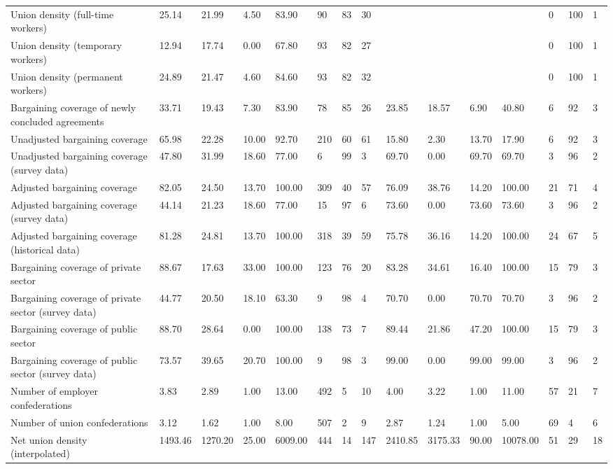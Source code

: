 \begin{longtable}{lllllllllllllll}
Union density (full-time workers) & 25.14 & 21.99 & 4.50 & 83.90 & 90 & 83 & 30 &  &  &  &  & 0 & 100 & 1\\
Union density (temporary workers) & 12.94 & 17.74 & 0.00 & 67.80 & 93 & 82 & 27 &  &  &  &  & 0 & 100 & 1\\
Union density (permanent workers) & 24.89 & 21.47 & 4.60 & 84.60 & 93 & 82 & 32 &  &  &  &  & 0 & 100 & 1\\
\addlinespace
Bargaining coverage of newly concluded agreements & 33.71 & 19.43 & 7.30 & 83.90 & 78 & 85 & 26 & 23.85 & 18.57 & 6.90 & 40.80 & 6 & 92 & 3\\
Unadjusted bargaining coverage & 65.98 & 22.28 & 10.00 & 92.70 & 210 & 60 & 61 & 15.80 & 2.30 & 13.70 & 17.90 & 6 & 92 & 3\\
Unadjusted bargaining coverage (survey data) & 47.80 & 31.99 & 18.60 & 77.00 & 6 & 99 & 3 & 69.70 & 0.00 & 69.70 & 69.70 & 3 & 96 & 2\\
Adjusted bargaining coverage & 82.05 & 24.50 & 13.70 & 100.00 & 309 & 40 & 57 & 76.09 & 38.76 & 14.20 & 100.00 & 21 & 71 & 4\\
Adjusted bargaining coverage (survey data) & 44.14 & 21.23 & 18.60 & 77.00 & 15 & 97 & 6 & 73.60 & 0.00 & 73.60 & 73.60 & 3 & 96 & 2\\
\addlinespace
Adjusted bargaining coverage (historical data) & 81.28 & 24.81 & 13.70 & 100.00 & 318 & 39 & 59 & 75.78 & 36.16 & 14.20 & 100.00 & 24 & 67 & 5\\
Bargaining coverage of private sector & 88.67 & 17.63 & 33.00 & 100.00 & 123 & 76 & 20 & 83.28 & 34.61 & 16.40 & 100.00 & 15 & 79 & 3\\
Bargaining coverage of private sector (survey data) & 44.77 & 20.50 & 18.10 & 63.30 & 9 & 98 & 4 & 70.70 & 0.00 & 70.70 & 70.70 & 3 & 96 & 2\\
Bargaining coverage of public sector & 88.70 & 28.64 & 0.00 & 100.00 & 138 & 73 & 7 & 89.44 & 21.86 & 47.20 & 100.00 & 15 & 79 & 3\\
Bargaining coverage of public sector (survey data) & 73.57 & 39.65 & 20.70 & 100.00 & 9 & 98 & 3 & 99.00 & 0.00 & 99.00 & 99.00 & 3 & 96 & 2\\
\addlinespace
Number of employer confederations & 3.83 & 2.89 & 1.00 & 13.00 & 492 & 5 & 10 & 4.00 & 3.22 & 1.00 & 11.00 & 57 & 21 & 7\\
Number of union confederations & 3.12 & 1.62 & 1.00 & 8.00 & 507 & 2 & 9 & 2.87 & 1.24 & 1.00 & 5.00 & 69 & 4 & 6\\
Net union density (interpolated) & 1493.46 & 1270.20 & 25.00 & 6009.00 & 444 & 14 & 147 & 2410.85 & 3175.33 & 90.00 & 10078.00 & 51 & 29 & 18\\

\end{longtable}
